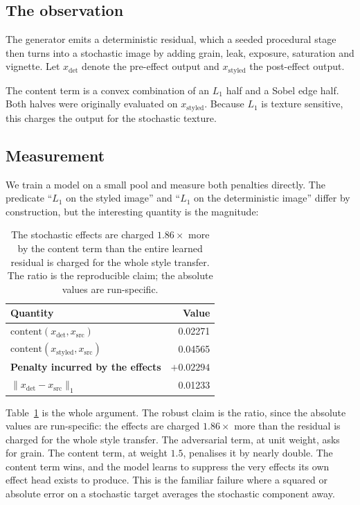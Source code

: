 \documentclass[11pt,a4paper]{article}
\begin{document}
\subsection{The observation}

The generator emits a deterministic residual, which a seeded procedural stage
then turns into a stochastic image by adding grain, leak, exposure, saturation
and vignette. Let $x_{\text{det}}$ denote the pre-effect output and
$x_{\text{styled}}$ the post-effect output.

The content term is a convex combination of an $L_1$ half and a Sobel edge half.
Both halves were originally evaluated on $x_{\text{styled}}$. Because $L_1$ is
texture sensitive, this charges the output for the stochastic texture.

\subsection{Measurement}

We train a model on a small pool and measure both penalties directly. The
predicate ``$L_1$ on the styled image'' and ``$L_1$ on the deterministic image''
differ by construction, but the interesting quantity is the magnitude:

\begin{table}[h]
\centering
\begin{tabular}{@{}lr@{}}
\toprule
Quantity & Value \\
\midrule
$\mathrm{content}(x_{\text{det}}, x_{\text{src}})$ & 0.02271 \\
$\mathrm{content}(x_{\text{styled}}, x_{\text{src}})$ & 0.04565 \\
\textbf{Penalty incurred by the effects} & \textbf{$+0.02294$} \\
\midrule
$\lVert x_{\text{det}} - x_{\text{src}} \rVert_1$ & 0.01233 \\
\bottomrule
\end{tabular}
\caption{The stochastic effects are charged $1.86\times$ more by the content
term than the entire learned residual is charged for the whole style transfer.
The ratio is the reproducible claim; the absolute values are run-specific.}
\label{tab:bias}
\end{table}

Table~\ref{tab:bias} is the whole argument. The robust claim is the ratio, since
the absolute values are run-specific: the effects are charged $1.86\times$ more
than the residual is charged for the whole style transfer. The adversarial term,
at unit weight, asks for grain. The content term, at weight $1.5$, penalises it
by nearly double. The content term wins, and the model learns to suppress the
very effects its own effect head exists to produce. This is the familiar failure
where a squared or absolute error on a stochastic target averages the stochastic
component away.
\end{document}
